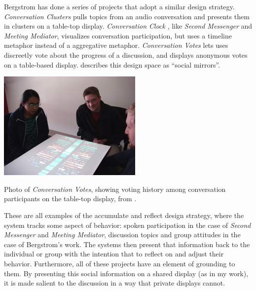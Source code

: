 \documentclass{tufte-handout}
\begin{document}
Bergstrom has done a series of projects that adopt a similar design strategy. \emph{Conversation Clusters} \citep{Bergstrom:2009fe} pulls topics from an audio conversation and presents them in clusters on a table-top display. \emph{Conversation Clock} \citep{Bergstrom:2007je}, like \emph{Second Messenger} and \emph{Meeting Mediator}, visualizes conversation participation, but uses a timeline metaphor instead of a aggregative metaphor. \emph{Conversation Votes} \citep{Bergstrom:2009ej} lets uses discreetly vote about the progress of a discussion, and displays anonymous votes on a table-based display. \citet{Karahalios:hu} describes this design space as ``social mirrors''. 

\begin{marginfigure}
	\includegraphics{figures/conversation_votes.jpg}
	\caption{Photo of \emph{Conversation Votes}, showing voting history among conversation participants on the table-top display, from \citep{Bergstrom:2009ej}.}
	\label{fig:conversation-votes}
\end{marginfigure}




These are all examples of the accumulate and reflect design strategy, where the system tracks some aspect of behavior: spoken participation in the case of \emph{Second Messenger} and \emph{Meeting Mediator}, discussion topics and group attitudes in the case of Bergstrom's work. The systems then present that information back to the individual or group with the intention that to reflect on and adjust their behavior. Furthermore, all of these projects have an element of grounding to them. By presenting this social information on a shared display (as in my work), it is made salient to the discussion in a way that private displays cannot.



\end{document}
